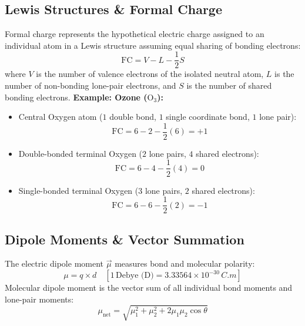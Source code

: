 \documentclass[10pt,twoside,openright]{book}
\begin{document}
\subsection{Lewis Structures \& Formal Charge}
\begin{formulabox}
Formal charge represents the hypothetical electric charge assigned to an individual atom in a Lewis structure assuming equal sharing of bonding electrons:
\begin{equation}
  \text{FC} = V - L - \frac{1}{2}S
\end{equation}
where $V$ is the number of valence electrons of the isolated neutral atom, $L$ is the number of non-bonding lone-pair electrons, and $S$ is the number of shared bonding electrons.
\textbf{Example: Ozone ($\mathrm{O_3}$):}
\begin{itemize}
  \item Central Oxygen atom ($1$ double bond, $1$ single coordinate bond, $1$ lone pair):
  \begin{equation}
    \text{FC} = 6 - 2 - \frac{1}{2}(6) = +1
  \end{equation}
  \item Double-bonded terminal Oxygen ($2$ lone pairs, $4$ shared electrons):
  \begin{equation}
    \text{FC} = 6 - 4 - \frac{1}{2}(4) = 0
  \end{equation}
  \item Single-bonded terminal Oxygen ($3$ lone pairs, $2$ shared electrons):
  \begin{equation}
    \text{FC} = 6 - 6 - \frac{1}{2}(2) = -1
  \end{equation}
\end{itemize}
\end{formulabox}

\subsection{Dipole Moments \& Vector Summation}
The electric dipole moment $\vec{\mu}$ measures bond and molecular polarity:
\begin{equation}
  \mu = q \times d \quad [1\,\text{Debye (D)} = 3.33564 \times 10^{-30}\,\si{C.m}]
\end{equation}
Molecular dipole moment is the vector sum of all individual bond moments and lone-pair moments:
\begin{equation}
  \mu_{\text{net}} = \sqrt{\mu_1^2 + \mu_2^2 + 2\mu_1\mu_2\cos\theta}
\end{equation}
\end{document}
